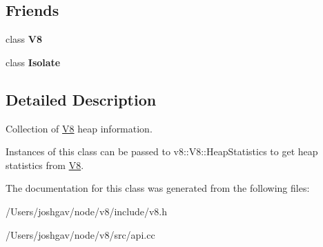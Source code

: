 \subsection*{Friends}
\begin{DoxyCompactItemize}
\item 
class {\bfseries V8}\hypertarget{classv8_1_1_heap_statistics_a51a1fbf409294cf02a99a020ac94a763}{}\label{classv8_1_1_heap_statistics_a51a1fbf409294cf02a99a020ac94a763}

\item 
class {\bfseries Isolate}\hypertarget{classv8_1_1_heap_statistics_aba4f0964bdacf2bbf62cf876e5d28d0a}{}\label{classv8_1_1_heap_statistics_aba4f0964bdacf2bbf62cf876e5d28d0a}

\end{DoxyCompactItemize}


\subsection{Detailed Description}
Collection of \hyperlink{classv8_1_1_v8}{V8} heap information.

Instances of this class can be passed to v8\+::\+V8\+::\+Heap\+Statistics to get heap statistics from \hyperlink{classv8_1_1_v8}{V8}. 

The documentation for this class was generated from the following files\+:\begin{DoxyCompactItemize}
\item 
/\+Users/joshgav/node/v8/include/v8.\+h\item 
/\+Users/joshgav/node/v8/src/api.\+cc\end{DoxyCompactItemize}

